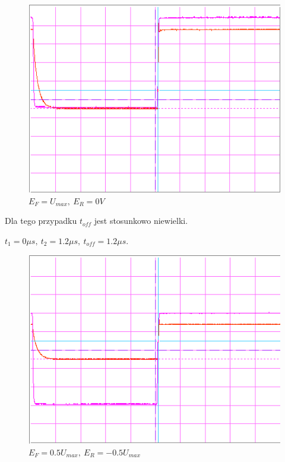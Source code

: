 \documentclass[a4paper,11pt]{article}
\begin{document}
\begin{figure} [H]
  \begin{center}
    \includegraphics{../Obrazki_i_tekst/obrobione/31asciety.png}
    \caption{\( E_F = U_{max}, \ E_R = 0V \)}
  \end{center}
\end{figure}

Dla tego przypadku \( t_{off} \) jest stosunkowo niewielki.

\(t_1 = 0 \mu s,\ t_2 = 1.2 \mu s,\ t_{off} = 1.2 \mu s \).

\begin{figure} [H]
  \begin{center}
    \includegraphics{../Obrazki_i_tekst/obrobione/31bsciety.png}
    \caption{\( E_F = 0.5 U_{max}, \ E_R = -0.5 U_{max}\)}
  \end{center}
\end{figure}
\end{document}

